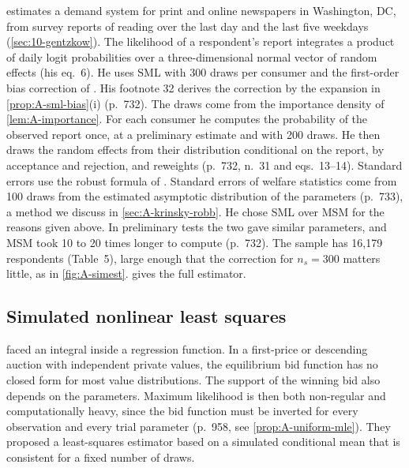 \citet{Gentzkow2007} estimates a demand system for print and online newspapers in Washington, DC, from survey reports
of reading over the last day and the last five weekdays (\cref{sec:10-gentzkow}). The likelihood of a respondent's
report integrates a product of daily logit probabilities over a three-dimensional normal vector of random effects
(his eq.~6). He uses SML with 300 draws per consumer and the first-order bias correction of
\citet[p.~45]{GourierouxMonfort1996}. His footnote 32 derives the correction by the expansion in
\cref{prop:A-sml-bias}(i) (p.~732). The draws come from the importance density of \cref{lem:A-importance}. For each consumer he computes the
probability of the observed report once, at a preliminary estimate and with 200 draws. He then draws the random
effects from their distribution conditional on the report, by acceptance and rejection, and reweights
(p.~732, n.~31 and eqs.~13--14). Standard errors use the robust formula of \citet{McFaddenTrain2000}. Standard
errors of welfare statistics come from 100 draws from the estimated asymptotic distribution of the parameters
(p.~733), a method we discuss in \cref{sec:A-krinsky-robb}. He chose SML over MSM for the reasons given above. In
preliminary tests the two gave similar parameters, and MSM took 10 to 20 times longer to compute (p.~732). The
sample has 16,179 respondents (Table~5), large enough that the correction for $n_s = 300$ matters little, as in
\cref{fig:A-simest}.  gives the full estimator.

\subsection{Simulated nonlinear least squares}\label{sec:A-snlls}

\citet{LaffontOssardVuong1995} faced an integral inside a regression function. In a first-price or descending
auction with independent private values, the equilibrium bid function has no closed form for most value
distributions. The support of the winning bid also depends on the parameters. Maximum likelihood is then both
non-regular and computationally heavy, since the bid function must be inverted for every observation and every trial
parameter (p.~958, see \cref{prop:A-uniform-mle}). They proposed a least-squares estimator based on a simulated
conditional mean that is consistent for a fixed number of draws.

